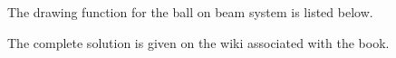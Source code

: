The drawing function for the ball on beam system is listed below.

%
\ifsolutionmanual

\else

\fi


The complete solution is given on the wiki associated with the book.








